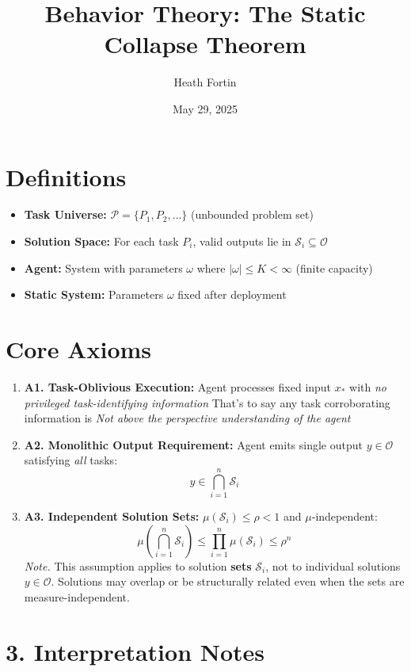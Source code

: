 \documentclass{article}
\newcommand{\Pcal}{\mathscr{P}}
\newcommand{\Scal}{\mathscr{S}}
\newcommand{\Ocal}{\mathscr{O}}
\begin{document}
\title{Behavior Theory: The Static Collapse Theorem}
\author{Heath Fortin}
\date{May 29, 2025}
\maketitle

\section{Definitions}
\begin{itemize}
  \item \textbf{Task Universe:} $\Pcal = \{P_1, P_2, \ldots\}$ (unbounded problem set)
  \item \textbf{Solution Space:} For each task $P_i$, valid outputs lie in $\Scal_i \subseteq \Ocal$
  \item \textbf{Agent:} System with parameters $\omega$ where $|\omega| \leq K < \infty$ (finite capacity)
  \item \textbf{Static System:} Parameters $\omega$ fixed after deployment
\end{itemize}

\section{Core Axioms}
\begin{enumerate}
  \item \textbf{A1. Task-Oblivious Execution:} 
  Agent processes fixed input $x_*$ with \textit{no privileged task-identifying information}
  That's to say any task corroborating information is \textit{Not above the perspective understanding of the agent}
		
  \item \textbf{A2. Monolithic Output Requirement:} 
  Agent emits single output $y \in \Ocal$ satisfying \textit{all} tasks:
  \[
  y \in \bigcap_{i=1}^{n} \Scal_i
  \]
  
  \item \textbf{A3. Independent Solution Sets:} 
  $\mu(\Scal_i) \leq \rho < 1$ and $\mu$-independent:
  \[
  \mu\left(\bigcap_{i=1}^{n}\Scal_i\right) \leq \prod_{i=1}^{n}\mu(\Scal_i) \leq \rho^{n}
  \]
  \textit{Note.} This assumption applies to solution \textbf{sets} $\mathcal{S}_i$, not to individual solutions $y \in \mathcal{O}$. Solutions may overlap or be structurally related even when the sets are measure-independent.
\end{enumerate}
\section*{3. Interpretation Notes}
\end{document}
